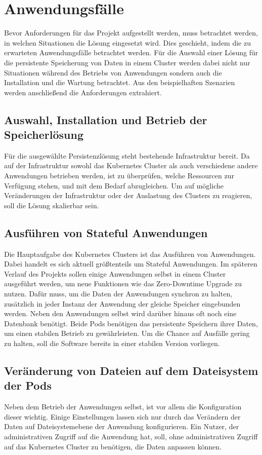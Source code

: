 \section{Anwendungsfälle}
Bevor Anforderungen für das Projekt aufgestellt werden, muss betrachtet werden, in welchen Situationen die Lösung eingesetzt wird. Dies geschieht, indem die zu erwarteten Anwendungsfälle betrachtet werden. Für die Auswahl einer Lösung für die persistente Speicherung von Daten in einem Cluster werden dabei nicht nur Situationen während des Betriebs von Anwendungen sondern auch die Installation und die Wartung betrachtet. Aus den beispielhaften Szenarien werden anschließend die Anforderungen extrahiert.

\subsection{Auswahl, Installation und Betrieb der Speicherlösung}
Für die ausgewählte Persistenzlösung steht bestehende Infrastruktur bereit. Da auf der Infrastruktur sowohl das Kubernetes Cluster als auch verschiedene andere Anwendungen betrieben werden, ist zu überprüfen, welche Ressourcen zur Verfügung stehen, und mit dem Bedarf abzugleichen. Um auf mögliche Veränderungen der Infrastruktur oder der Auslastung des Clusters zu reagieren, soll die Lösung skalierbar sein.

\subsection{Ausführen von Stateful Anwendungen}
Die Hauptaufgabe des Kubernetes Clusters ist das Ausführen von Anwendungen. Dabei handelt es sich aktuell größtenteils um Stateful Anwendungen. Im späteren Verlauf des Projekts sollen einige Anwendungen selbst in einem Cluster ausgeführt werden, um neue Funktionen wie das Zero-Downtime Upgrade zu nutzen. Dafür muss, um die Daten der Anwendungen synchron zu halten, zusätzlich in jeder Instanz der Anwendung der gleiche Speicher eingebunden werden. Neben den Anwendungen selbst wird darüber hinaus oft noch eine Datenbank benötigt. Beide Pods benötigen das persistente Speichern ihrer Daten, um einen stabilen Betrieb zu gewährleisten. Um die Chance auf Ausfälle gering zu halten, soll die Software bereits in einer stabilen Version vorliegen.

\subsection{Veränderung von Dateien auf dem Dateisystem der Pods}
Neben dem Betrieb der Anwendungen selbst, ist vor allem die Konfiguration dieser wichtig. Einige Einstellungen lassen sich nur durch das Verändern der Daten auf Dateisystemebene der Anwendung konfigurieren. Ein Nutzer, der administrativen Zugriff auf die Anwendung hat, soll, ohne administrativen Zugriff auf das Kubernetes Cluster zu benötigen, die Daten anpassen können.

